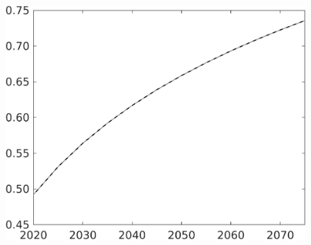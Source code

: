\documentclass[12pt]{article}
\begin{document}
\begin{figure}[h!!]
\begin{minipage}[]{0.32\textwidth}
	\end{minipage}		
	\begin{minipage}[]{0.32\textwidth}
		\includegraphics[width=1\textwidth]{../../codding_model/own_basedOnFried/optimalPol_010922_revision/figures/all_13Sept22/CompTaul_Equlab_LFBAU_Reg0_LgLf_spillover0_nsk1_xgr0_knspil0_sep1_countec0_GovRev0_etaa0.79_lgd0.png}
	\end{minipage}	
\end{figure}
\end{document}
